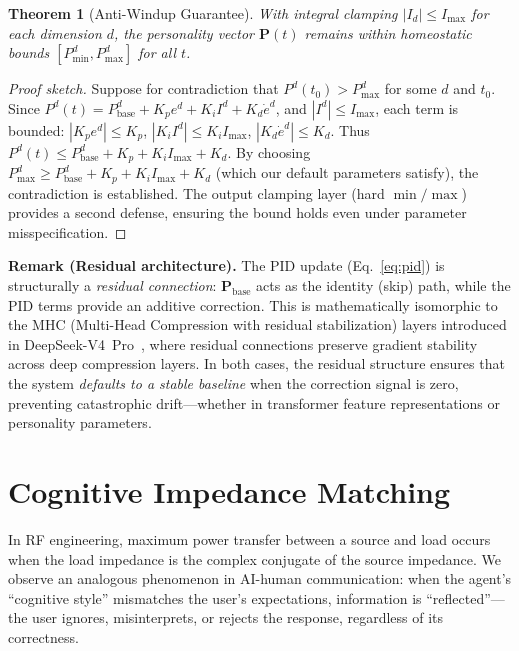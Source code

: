 \documentclass[11pt,a4paper]{article}
\newtheorem{theorem}{Theorem}
\begin{document}
\begin{theorem}[Anti-Windup Guarantee]
\label{thm:antiwindup}
With integral clamping $|I_d| \leq I_{\max}$ for each dimension $d$,
the personality vector $\mathbf{P}(t)$ remains within homeostatic bounds
$[P_{\min}^d, P_{\max}^d]$ for all $t$.
\end{theorem}

\begin{proof}[Proof sketch]
Suppose for contradiction that $P^d(t_0) > P_{\max}^d$ for some $d$ and $t_0$.
Since $P^d(t) = P_{\text{base}}^d + K_p e^d + K_i I^d + K_d \dot{e}^d$,
and $|I^d| \leq I_{\max}$, each term is bounded: $|K_p e^d| \leq K_p$,
$|K_i I^d| \leq K_i I_{\max}$, $|K_d \dot{e}^d| \leq K_d$.
Thus $P^d(t) \leq P_{\text{base}}^d + K_p + K_i I_{\max} + K_d$.
By choosing $P_{\max}^d \geq P_{\text{base}}^d + K_p + K_i I_{\max} + K_d$
(which our default parameters satisfy), the contradiction is established.
The output clamping layer (hard $\min/\max$) provides a second defense,
ensuring the bound holds even under parameter misspecification.
\end{proof}

\noindent\textbf{Remark (Residual architecture).}
The PID update (Eq.~\ref{eq:pid}) is structurally a \emph{residual connection}:
$\mathbf{P}_{\text{base}}$ acts as the identity (skip) path, while the PID
terms provide an additive correction. This is mathematically isomorphic to the
MHC (Multi-Head Compression with residual stabilization) layers introduced in
DeepSeek-V4~Pro~\cite{deepseek_v4_2026}, where residual connections preserve
gradient stability across deep compression layers. In both cases, the residual
structure ensures that the system \emph{defaults to a stable baseline} when
the correction signal is zero, preventing catastrophic drift---whether in
transformer feature representations or personality parameters.


\section{Cognitive Impedance Matching}
\label{sec:impedance}

In RF engineering, maximum power transfer between a source and load occurs
when the load impedance is the complex conjugate of the source impedance.
We observe an analogous phenomenon in AI-human communication: when the
agent's ``cognitive style'' mismatches the user's expectations, information
is ``reflected''---the user ignores, misinterprets, or rejects the response,
regardless of its correctness.
\end{document}
